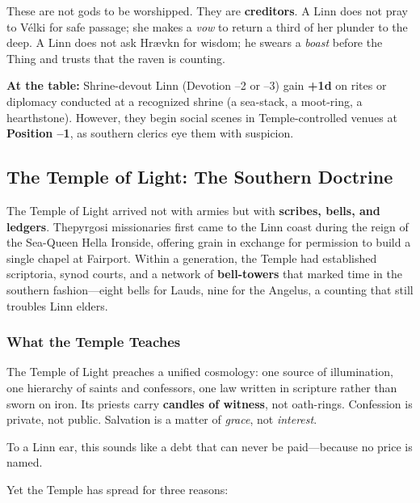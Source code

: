 \documentclass[11pt]{article}
\begin{document}
These are not gods to be worshipped. They are \textbf{creditors}. A Linn does not pray to Vélki for safe passage; she makes a \textit{vow} to return a third of her plunder to the deep. A Linn does not ask Hrævkn for wisdom; he swears a \textit{boast} before the Thing and trusts that the raven is counting.

\begin{mechanicbox}
\textbf{At the table:} Shrine-devout Linn (Devotion --2 or --3) gain \textbf{+1d} on rites or diplomacy conducted at a recognized shrine (a sea-stack, a moot-ring, a hearthstone). However, they begin social scenes in Temple-controlled venues at \textbf{Position --1}, as southern clerics eye them with suspicion.
\end{mechanicbox}

\subsection{The Temple of Light: The Southern Doctrine}

The Temple of Light arrived not with armies but with \textbf{scribes, bells, and ledgers}. Thepyrgosi missionaries first came to the Linn coast during the reign of the Sea-Queen Hella Ironside, offering grain in exchange for permission to build a single chapel at Fairport. Within a generation, the Temple had established scriptoria, synod courts, and a network of \textbf{bell-towers} that marked time in the southern fashion---eight bells for Lauds, nine for the Angelus, a counting that still troubles Linn elders.

\subsubsection{What the Temple Teaches}

The Temple of Light preaches a unified cosmology: one source of illumination, one hierarchy of saints and confessors, one law written in scripture rather than sworn on iron. Its priests carry \textbf{candles of witness}, not oath-rings. Confession is private, not public. Salvation is a matter of \textit{grace}, not \textit{interest}.

To a Linn ear, this sounds like a debt that can never be paid---because no price is named.

Yet the Temple has spread for three reasons:
\end{document}
